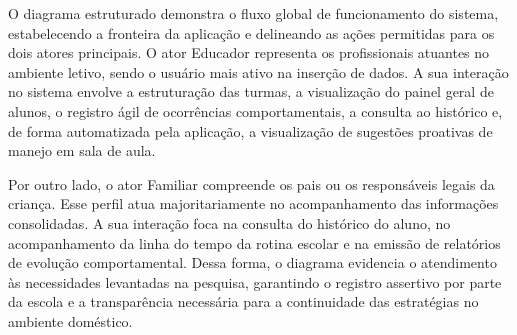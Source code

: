 O diagrama estruturado demonstra o fluxo global de funcionamento do sistema, estabelecendo a fronteira da aplicação e delineando as ações permitidas para os dois atores principais. O ator Educador representa os profissionais atuantes no ambiente letivo, sendo o usuário mais ativo na inserção de dados. A sua interação no sistema envolve a estruturação das turmas, a visualização do painel geral de alunos, o registro ágil de ocorrências comportamentais, a consulta ao histórico e, de forma automatizada pela aplicação, a visualização de sugestões proativas de manejo em sala de aula.

Por outro lado, o ator Familiar compreende os pais ou os responsáveis legais da criança. Esse perfil atua majoritariamente no acompanhamento das informações consolidadas. A sua interação foca na consulta do histórico do aluno, no acompanhamento da linha do tempo da rotina escolar e na emissão de relatórios de evolução comportamental. Dessa forma, o diagrama evidencia o atendimento às necessidades levantadas na pesquisa, garantindo o registro assertivo por parte da escola e a transparência necessária para a continuidade das estratégias no ambiente doméstico.

